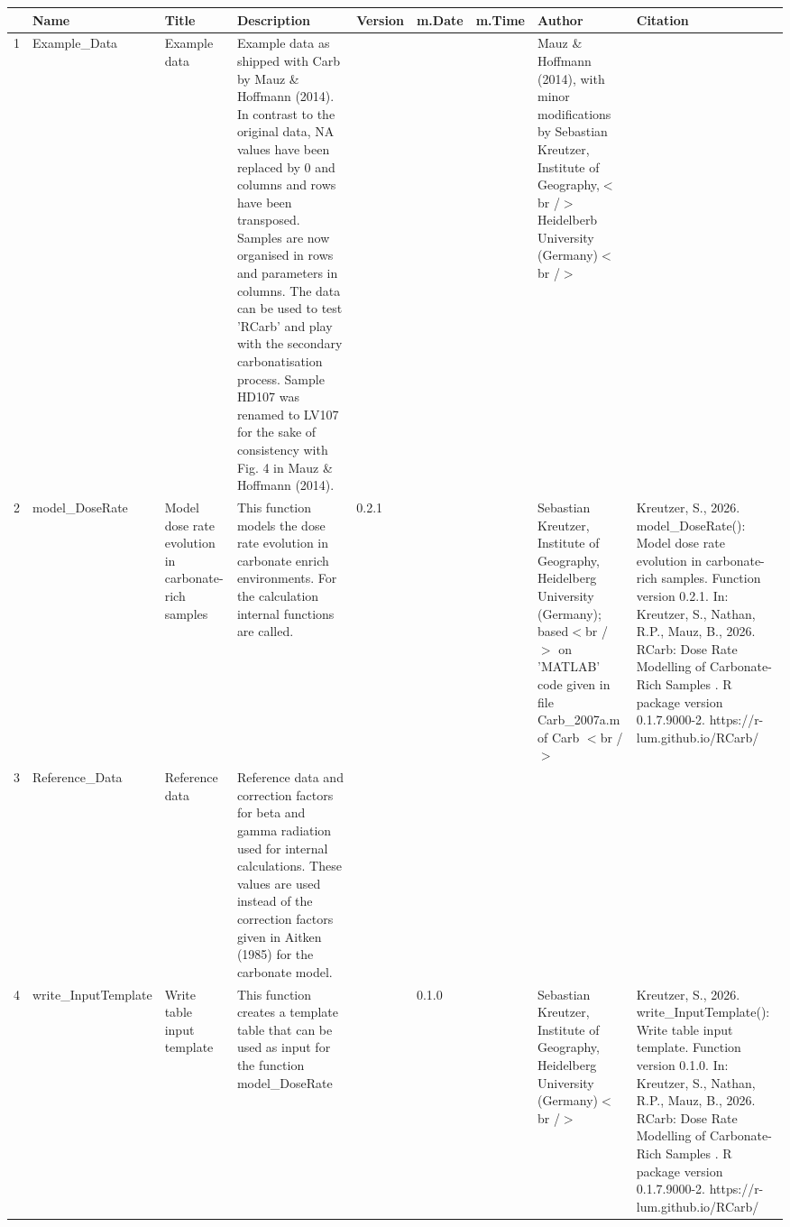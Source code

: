 \begin{table}[ht]
\centering
\begin{tabular}{rllllllll}
  \hline
 & Name & Title & Description & Version & m.Date & m.Time & Author & Citation \\ 
  \hline
1 & Example\_Data & Example data & Example data as shipped with  Carb  by Mauz \& Hoffmann (2014). In contrast to the original data,  NA  values have been replaced by 0 and columns and rows have been transposed. Samples are now organised in rows and parameters in columns.  The data can be used to test  'RCarb'  and play with the secondary carbonatisation process. Sample HD107 was renamed to LV107 for the sake of consistency with Fig. 4 in Mauz \& Hoffmann (2014). &  &  &  & Mauz \& Hoffmann (2014), with minor modifications by Sebastian Kreutzer, Institute of Geography,$<$br /$>$ Heidelberb University (Germany)$<$br /$>$ &  \\ 
  2 & model\_DoseRate & Model dose rate evolution in carbonate-rich samples & This function models the dose rate evolution in carbonate enrich environments. For the calculation internal functions are called. & 0.2.1
 &  &  & Sebastian Kreutzer, Institute of Geography, Heidelberg University (Germany); based$<$br /$>$ on 'MATLAB' code given in file Carb\_2007a.m of  Carb $<$br /$>$ & Kreutzer, S., 2026. model\_DoseRate(): Model dose rate evolution in carbonate-rich samples. Function version 0.2.1. In: Kreutzer, S., Nathan, R.P., Mauz, B., 2026. RCarb: Dose Rate Modelling of Carbonate-Rich Samples . R package version 0.1.7.9000-2. https://r-lum.github.io/RCarb/
 \\ 
  3 & Reference\_Data & Reference data & Reference data and correction factors for beta and gamma radiation used for internal calculations. These values are used instead of the correction factors given in Aitken (1985) for the carbonate model. &  &  &  &  &  \\ 
  4 & write\_InputTemplate & Write table input template & This function creates a template table that can be used as input for the function model\_DoseRate &  & 0.1.0
 &  & Sebastian Kreutzer, Institute of Geography, Heidelberg University (Germany)$<$br /$>$ & Kreutzer, S., 2026. write\_InputTemplate(): Write table input template. Function version 0.1.0. In: Kreutzer, S., Nathan, R.P., Mauz, B., 2026. RCarb: Dose Rate Modelling of Carbonate-Rich Samples . R package version 0.1.7.9000-2. https://r-lum.github.io/RCarb/
 \\ 
   \hline
\end{tabular}
\end{table}

